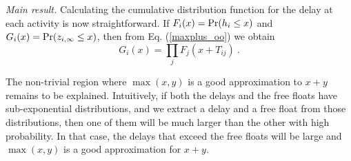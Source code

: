 \documentclass[reprint,aps,prl,amsmath,amssymb,superscriptaddress,showpacs]{revtex4-1}
\begin{document}
{\em Main result.} Calculating the cumulative distribution function for the delay at each activity is now straightforward. If $F_i(x)={\rm Pr}(h_i\leq x)$ and $G_i(x) = {\rm Pr}(z_{i,\infty}\leq x)$, then from Eq. (\ref{maxplus_oo}) we obtain
%
\begin{equation}
G_i(x) = \prod_{j} F_j(x+T_{ij})\ .
\label{CDF}
\end{equation}
%

The non-trivial region where $\max(x,y)$ is a good approximation to $x+y$ remains to be explained. Intuitively, if both the delays and the free floats have sub-exponential distributions, and we extract a delay and a free float from those distributions, then one of them will be much larger than the other with high probability. In that case, the delays that exceed the free floats will be large and $\max(x,y)$ is a good approximation for $x+y$.




\end{document}
